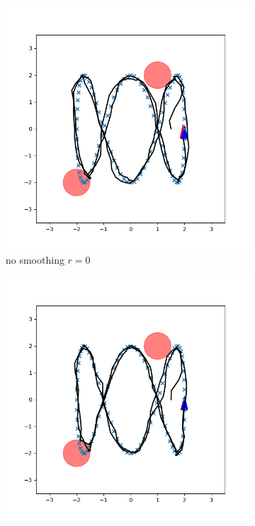 \documentclass[conference]{IEEEtran}
\begin{document}
\begin{figure}[h]
    \centering
    \begin{subfigure}[b]{0.3\textwidth}
        \includegraphics[width=\textwidth]{../fig/trajectory.cec.r_0.png}
        \caption{no smoothing $r=0$}
        \label{fig:r0}
    \end{subfigure}
    \hfill
    \begin{subfigure}[b]{0.3\textwidth}
        \includegraphics[width=\textwidth]{../fig/trajectory.cec.png}

\end{subfigure}
\end{figure}
\end{document}
